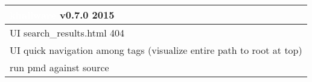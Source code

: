 \documentclass[notitlepage]{article}
\newcommand{\releasedate}{2015}
\begin{document}
\begin{center}
\begin{tabular}{ | l | }
\hline
\LARGE\cellcolor{myblue}\textcolor{white}{khallware} v0.7.0 \releasedate{} \\
\hline
UI search\_results.html 404 \\
\hline
UI quick navigation among tags (visualize entire path to root at top) \\
\hline
run pmd against source \\
\hline

\end{tabular}
\end{center}
\end{document}
